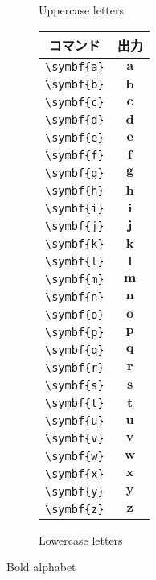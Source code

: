 \begin{figure}[htbp]
\begin{subfigure}{.5\textwidth}
\begin{tabular}{cc}
            \bottomrule
        \end{tabular}
        \caption{Uppercase letters}
        \label{fig:uppercase}
    \end{subfigure}%
    \begin{subfigure}{.5\textwidth}
        \centering
        \begin{tabular}{cc}
            \toprule
            コマンド         & 出力          \\
            \midrule
            \verb|\symbf{a}| & \(\symbf{a}\) \\
            \verb|\symbf{b}| & \(\symbf{b}\) \\
            \verb|\symbf{c}| & \(\symbf{c}\) \\
            \verb|\symbf{d}| & \(\symbf{d}\) \\
            \verb|\symbf{e}| & \(\symbf{e}\) \\
            \verb|\symbf{f}| & \(\symbf{f}\) \\
            \verb|\symbf{g}| & \(\symbf{g}\) \\
            \verb|\symbf{h}| & \(\symbf{h}\) \\
            \verb|\symbf{i}| & \(\symbf{i}\) \\
            \verb|\symbf{j}| & \(\symbf{j}\) \\
            \verb|\symbf{k}| & \(\symbf{k}\) \\
            \verb|\symbf{l}| & \(\symbf{l}\) \\
            \verb|\symbf{m}| & \(\symbf{m}\) \\
            \verb|\symbf{n}| & \(\symbf{n}\) \\
            \verb|\symbf{o}| & \(\symbf{o}\) \\
            \verb|\symbf{p}| & \(\symbf{p}\) \\
            \verb|\symbf{q}| & \(\symbf{q}\) \\
            \verb|\symbf{r}| & \(\symbf{r}\) \\
            \verb|\symbf{s}| & \(\symbf{s}\) \\
            \verb|\symbf{t}| & \(\symbf{t}\) \\
            \verb|\symbf{u}| & \(\symbf{u}\) \\
            \verb|\symbf{v}| & \(\symbf{v}\) \\
            \verb|\symbf{w}| & \(\symbf{w}\) \\
            \verb|\symbf{x}| & \(\symbf{x}\) \\
            \verb|\symbf{y}| & \(\symbf{y}\) \\
            \verb|\symbf{z}| & \(\symbf{z}\) \\
            \bottomrule
        \end{tabular}
        \caption{Lowercase letters}
        \label{fig:lowercase}
    \end{subfigure}
    \caption{Bold alphabet}
    \label{fig:bold_alphabet}
\end{figure}


